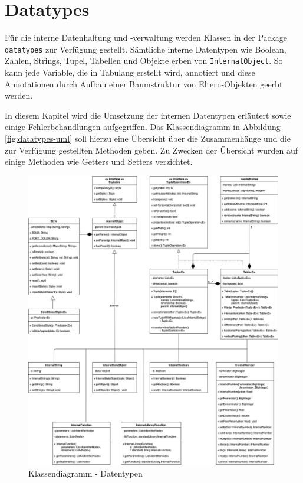 \pagebreak

\section{Datatypes}

Für die interne Datenhaltung und -verwaltung werden Klassen in der
Package \lstinline{datatypes} zur Verfügung gestellt. Sämtliche
interne Datentypen wie Boolean, Zahlen, Strings, Tupel, Tabellen
und Objekte erben von \lstinline{InternalObject}. So kann jede Variable, die
in Tabulang erstellt wird, annotiert und diese Annotationen durch
Aufbau einer Baumstruktur von Eltern-Objekten geerbt werden.

In diesem Kapitel wird die Umsetzung der internen Datentypen erläutert
sowie einige Fehlerbehandlungen aufgegriffen. Das Klassendiagramm in 
Abbildung \ref{fig:datatypes-uml} soll hierzu eine Übersicht über die
Zusammenhänge und die zur Verfügung gestellten Methoden geben. Zu Zwecken
der Übersicht wurden auf einige Methoden wie Getters und Setters verzichtet.

\begin{figure}[]
\centering
\includegraphics[width=\textwidth]{"images/datatypes-uml.png"}
\caption{Klassendiagramm - Datentypen}
\end{figure}\label{fig:datatypes-uml}

